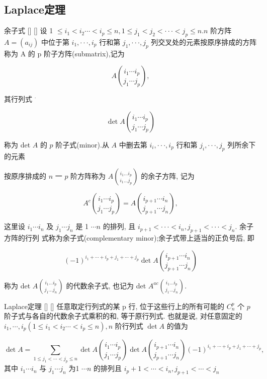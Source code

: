 \documentclass[UTF8]{ctexart}
\DeclareMathOperator{\0}{\mathbf{0}}
\DeclareMathOperator{\<}{\langle}
\renewcommand{\>}{\rangle}
\begin{document}
	
	
	\subsection{Laplace定理}

    \begin{dfn}
			[]
			{余子式}
			[]
			[]
        设 1 \(\leqslant i_1<i_2\cdots<i_p\leqslant n,1\leqslant j_1<j_2<\cdotp\cdotp\cdotp<j_p\leqslant n.n\) 阶方阵 \(A=(a_{ij})\) 中位于第 \(i_1,\cdotp\cdotp\cdotp,i_p\) 行和第 \(j_1,\cdotp\cdotp\cdotp,j_p\) 列交叉处的元素按原序排成的方阵称为 A 的 p 阶子方阵(submatrix),记为

        \[A\binom{i_1\cdots i_p}{j_1\cdots j_p},\]

        其行列式 \(^{\cdot}\) 

        \[\det A\binom{i_1\cdots i_p}{j_1\cdots j_p}\]

        称为 det  \(A\) 的 \(p\) 阶子式(minor).从 \(A\) 中删去第 \(i_i,\cdotp\cdotp\cdotp,i_p\) 行和第 \(j_i,\cdotp\cdotp\cdotp,j_p\) 列所余下的元素

        按原序排成的  \(n\) 一 \(p\)  阶方阵称为  \(A\binom{i_1\ldots i_p}{i_1\ldots j_p}\) 的余子方阵, 记为

        \[A^c\binom{i_1\cdots i_p}{j_1\cdots j_p}=A\binom{i_{p+1}\cdots i_n}{j_{p+1}\cdots j_n},\]

        这里设 \(i_1\cdots i_n\) 及 \(j_1\cdots j_n\) 是 1 \(\cdots n\) 的排列, 且 \(i_{p+1}<\cdotp\cdotp\cdotp<i_n,j_{p+1}<\cdotp\cdotp\cdotp<j_n.\) 余子方阵的行列
        式称为余子式(complementary minor);余子式带上适当的正负号后, 即

        \[(-1)^{i_1+\cdots+i_p+j_1+\cdots+j_p}\det A\binom{i_{p+1}\cdots i_n}{j_{p+1}\cdots j_n}\]

        称为 det  \(A\binom{i_1\ldots i_p}{j_1\ldots j_n}\) 的代数余子式, 也记为 det  \(A^{ac}{\binom{i_1\ldots i_p}{j_1\ldots j_n}}.\) 
    \end{dfn}

    \begin{thm}
			[]
			{Laplace定理}
			[]
			[]
        任意取定行列式的某 p 行, 位于这些行上的所有可能的 \(C_{n}^{p}\) 个 \(p\) 阶子式与各自的代数余子式乘积的和, 等于原行列式. 也就是说, 对任意固定的 \(i_{1},\cdots,i_{p}\left(1\leqslant i_{1}<i_{2}\cdots<i_{p}\leqslant n\right),n\) 阶行列式 \(\det A\) 的值为

        \[\det A=\sum_{1\leqslant j_{1}<\cdots<j_{p}\leqslant n}\det A\binom{i_{1}\cdots i_{p}}{j_{1}\cdots j_{p}}\det A\binom{i_{p+1}\cdots i_{n}}{j_{p+1}\cdots j_{n}}(-1)^{i_{1}+\cdots+i_{p}+j_{1}+\cdots+j_{p}},\]
        其中 \(i_1\cdots i_n\) 与 \(j_1\cdots j_n\) 为1 \(\cdots n\) 的排列且 \(i_p+1<\cdots<i_n,j_{p+1}<\cdots<j_n\) 
    \end{thm}
\end{document}
